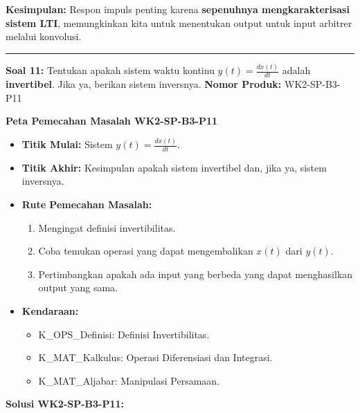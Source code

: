\documentclass[
  letterpaper,
  DIV=11,
  numbers=noendperiod]{scrreprt}
\providecommand{\tightlist}{%
  \setlength{\itemsep}{0pt}\setlength{\parskip}{0pt}}
\begin{document}
\textbf{Kesimpulan:} Respon impuls penting karena \textbf{sepenuhnya
mengkarakterisasi sistem LTI}, memungkinkan kita untuk menentukan output
untuk input arbitrer melalui konvolusi.

\begin{center}\rule{0.5\linewidth}{0.5pt}\end{center}

\textbf{Soal 11:} Tentukan apakah sistem waktu kontinu
\(y(t) = \frac{dx(t)}{dt}\) adalah \textbf{invertibel}. Jika ya, berikan
sistem inversnya. \textbf{Nomor Produk:} WK2-SP-B3-P11

\textbf{Peta Pemecahan Masalah WK2-SP-B3-P11}

\begin{itemize}
\tightlist
\item
  \textbf{Titik Mulai:} Sistem \(y(t) = \frac{dx(t)}{dt}\).
\item
  \textbf{Titik Akhir:} Kesimpulan apakah sistem invertibel dan, jika
  ya, sistem inversnya.
\item
  \textbf{Rute Pemecahan Masalah:}

  \begin{enumerate}
  \def\labelenumi{\arabic{enumi}.}
  \tightlist
  \item
    Mengingat definisi invertibilitas.
  \item
    Coba temukan operasi yang dapat mengembalikan \(x(t)\) dari
    \(y(t)\).
  \item
    Pertimbangkan apakah ada input yang berbeda yang dapat menghasilkan
    output yang sama.
  \end{enumerate}
\item
  \textbf{Kendaraan:}

  \begin{itemize}
  \tightlist
  \item
    K\_OPS\_Definisi: Definisi Invertibilitas.
  \item
    K\_MAT\_Kalkulus: Operasi Diferensiasi dan Integrasi.
  \item
    K\_MAT\_Aljabar: Manipulasi Persamaan.
  \end{itemize}
\end{itemize}

\textbf{Solusi WK2-SP-B3-P11:}
\end{document}
